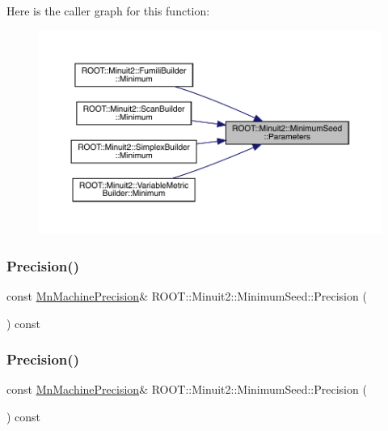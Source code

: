 Here is the caller graph for this function\+:\nopagebreak
\begin{figure}[H]
\begin{center}
\leavevmode
\includegraphics[width=350pt]{d1/d50/classROOT_1_1Minuit2_1_1MinimumSeed_a994d60b61e96fefc68cbccab8f82794d_icgraph}
\end{center}
\end{figure}
\mbox{\label{classROOT_1_1Minuit2_1_1MinimumSeed_a0cc83616e61f2d3552cedf34ed09e361}} 
\subsubsection{\texorpdfstring{Precision()}{Precision()}\hspace{0.1cm}{\footnotesize\ttfamily [1/2]}}
{\footnotesize\ttfamily const \mbox{\hyperlink{classROOT_1_1Minuit2_1_1MnMachinePrecision}{Mn\+Machine\+Precision}}\& R\+O\+O\+T\+::\+Minuit2\+::\+Minimum\+Seed\+::\+Precision (\begin{DoxyParamCaption}{ }\end{DoxyParamCaption}) const\hspace{0.3cm}{\ttfamily [inline]}}

\mbox{\label{classROOT_1_1Minuit2_1_1MinimumSeed_a0cc83616e61f2d3552cedf34ed09e361}} 
\subsubsection{\texorpdfstring{Precision()}{Precision()}\hspace{0.1cm}{\footnotesize\ttfamily [2/2]}}
{\footnotesize\ttfamily const \mbox{\hyperlink{classROOT_1_1Minuit2_1_1MnMachinePrecision}{Mn\+Machine\+Precision}}\& R\+O\+O\+T\+::\+Minuit2\+::\+Minimum\+Seed\+::\+Precision (\begin{DoxyParamCaption}{ }\end{DoxyParamCaption}) const\hspace{0.3cm}{\ttfamily [inline]}}


